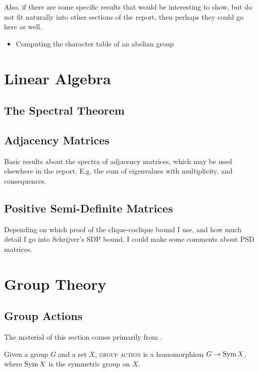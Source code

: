 \documentclass{report}
\begin{document}
  Also, if there are some specific results that would be interesting to show,
  but do not fit naturally into other sections of the report, then perhaps they
  could go here as well.

  \begin{itemize}
    \item Computing the character table of an abelian group
  \end{itemize}

\appendix

\chapter{Linear Algebra}
  \section{The Spectral Theorem}

  \section{Adjacency Matrices}
    Basic results about the spectra of adjacency matrices, which may be used
    elsewhere in the report.  E.g. the sum of eigenvalues with multiplicity, and
    consequences.

  \section{Positive Semi-Definite Matrices}
    Depending on which proof of the clique-coclique bound I use, and how much
    detail I go into Schrijver's SDP bound, I could make some comments about PSD
    matrices.

\chapter{Group Theory}
  \section{Group Actions}
    The material of this section comes primarily from \cite[Section~1.7;
    Chapter~4]{dummit-foote}.

    \begin{defn}\label{group-action}
      Given a group $G$ and a set $X$,
      \textsc{group action} is a homomorphism $G \to \operatorname{Sym} X$,
      where $\operatorname{Sym} X$ is the symmetric group on $X$.
    \end{defn}
\end{document}
